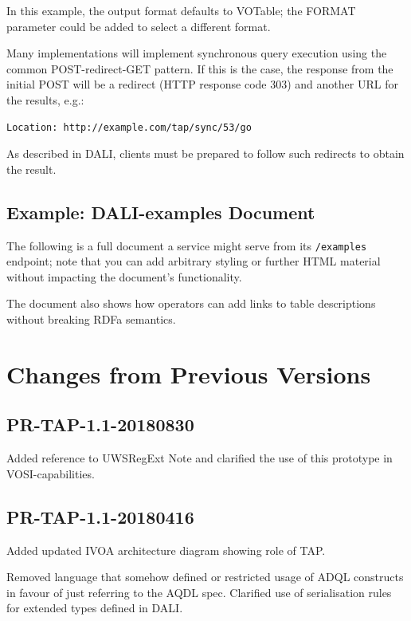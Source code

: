 \documentclass[11pt,letter]{ivoa}
\begin{document}
In this example, the output format defaults to VOTable; 
the FORMAT parameter could be added to select a different format.

Many implementations will implement synchronous query execution using the 
common POST-redirect-GET pattern. If this is the case, the response from the 
initial POST will be a redirect (HTTP response code 303) and another URL for the 
results, e.g.: 

\begin{verbatim}
Location: http://example.com/tap/sync/53/go
\end{verbatim}

As described in DALI, clients must be prepared to follow such 
redirects to obtain the result.

\subsection{Example: DALI-examples Document}
\label{sect:example-example}

The following is a full document a service might serve from its
\verb|/examples| endpoint; note that you can add arbitrary styling or
further HTML material without impacting the document's functionality.

The document also shows how operators can add links to table
descriptions without breaking RDFa semantics.



\appendix

\section{Changes from Previous Versions}

\subsection{PR-TAP-1.1-20180830}

Added reference to UWSRegExt Note and clarified the use of this prototype in VOSI-capabilities.

\subsection{PR-TAP-1.1-20180416}

Added updated IVOA architecture diagram showing role of TAP.

Removed language that somehow defined or restricted usage of ADQL constructs in
favour of just referring to the AQDL spec. Clarified use of serialisation
rules for extended types defined in DALI.
\end{document}
